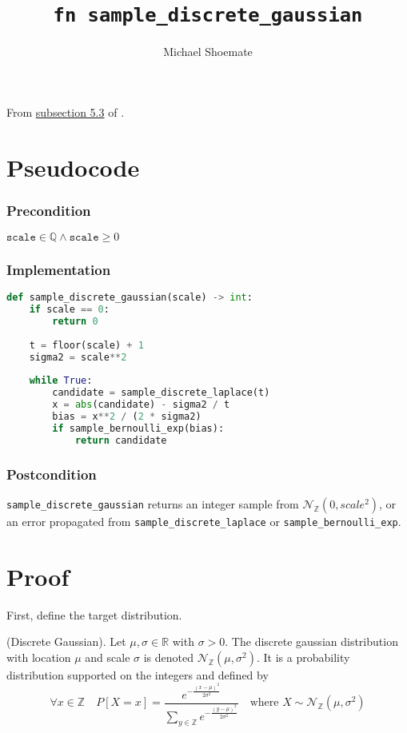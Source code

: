 \documentclass{article}
\title{\texttt{fn sample\_discrete\_gaussian}}
\author{Michael Shoemate}
\begin{document}
\maketitle

From \href{https://arxiv.org/pdf/2004.00010.pdf#subsection.5.3}{subsection 5.3} of \cite{CKS20}.

\section{Pseudocode}
\subsubsection*{Precondition}
$\texttt{scale} \in \mathbb{Q} \land \texttt{scale} \geq 0$

\subsubsection*{Implementation}        
\begin{lstlisting}[language=Python]
def sample_discrete_gaussian(scale) -> int:
    if scale == 0:
        return 0
    
    t = floor(scale) + 1
    sigma2 = scale**2
    
    while True:
        candidate = sample_discrete_laplace(t)
        x = abs(candidate) - sigma2 / t
        bias = x**2 / (2 * sigma2)
        if sample_bernoulli_exp(bias):
            return candidate
\end{lstlisting}

\subsubsection*{Postcondition}
\texttt{sample\_discrete\_gaussian} returns an integer sample from $\mathcal{N}_\mathbb{Z}(0, scale^2)$, or an error propagated from \texttt{sample\_discrete\_laplace} or \texttt{sample\_bernoulli\_exp}.

\section{Proof}

First, define the target distribution.

\begin{definition}
    (Discrete Gaussian). Let $\mu, \sigma \in \mathbb{R}$ with $\sigma > 0$. 
    The discrete gaussian distribution with location $\mu$ and scale $\sigma$ is denoted $\mathcal{N}_\mathbb{Z}(\mu, \sigma^2)$. 
    It is a probability distribution supported on the integers and defined by \cite{CKS20}
\begin{equation*}
    \forall x \in \mathbb{Z} \quad  P[X = x] = \frac{e^{-\frac{(x - \mu)^2}{2\sigma^2}}}{\sum_{y\in\mathbb{Z}}e^{-\frac{(y - \mu)^2}{2\sigma^2}}} \quad \text{where } X \sim \mathcal{N}_\mathbb{Z}(\mu, \sigma^2)
\end{equation*}
\end{definition}
\end{document}
